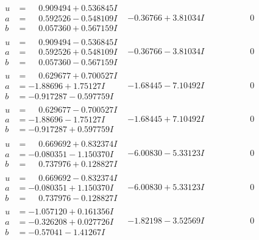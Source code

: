\documentclass[1p]{elsarticle_modified}
\theoremstyle{definition}
\begin{document}
$$\begin{array}{c|c|c}
\begin{aligned}
u &= \phantom{-}0.909494 + 0.536845 I \\
a &= \phantom{-}0.592526 - 0.548109 I \\
b &= \phantom{-}0.057360 + 0.567159 I\end{aligned}
 & -0.36766 + 3.81034 I & \phantom{-0.000000 } 0 \\ \hline\begin{aligned}
u &= \phantom{-}0.909494 - 0.536845 I \\
a &= \phantom{-}0.592526 + 0.548109 I \\
b &= \phantom{-}0.057360 - 0.567159 I\end{aligned}
 & -0.36766 - 3.81034 I & \phantom{-0.000000 } 0 \\ \hline\begin{aligned}
u &= \phantom{-}0.629677 + 0.700527 I \\
a &= -1.88696 + 1.75127 I \\
b &= -0.917287 - 0.597759 I\end{aligned}
 & -1.68445 - 7.10492 I & \phantom{-0.000000 } 0 \\ \hline\begin{aligned}
u &= \phantom{-}0.629677 - 0.700527 I \\
a &= -1.88696 - 1.75127 I \\
b &= -0.917287 + 0.597759 I\end{aligned}
 & -1.68445 + 7.10492 I & \phantom{-0.000000 } 0 \\ \hline\begin{aligned}
u &= \phantom{-}0.669692 + 0.832374 I \\
a &= -0.080351 - 1.150370 I \\
b &= \phantom{-}0.737976 + 0.128827 I\end{aligned}
 & -6.00830 - 5.33123 I & \phantom{-0.000000 } 0 \\ \hline\begin{aligned}
u &= \phantom{-}0.669692 - 0.832374 I \\
a &= -0.080351 + 1.150370 I \\
b &= \phantom{-}0.737976 - 0.128827 I\end{aligned}
 & -6.00830 + 5.33123 I & \phantom{-0.000000 } 0 \\ \hline\begin{aligned}
u &= -1.057120 + 0.161356 I \\
a &= -0.326208 + 0.027726 I \\
b &= -0.57041 - 1.41267 I\end{aligned}
 & -1.82198 - 3.52569 I & \phantom{-0.000000 } 0 \\ \hline\begin{aligned}

\end{aligned}
\end{array}$$
\end{document}
